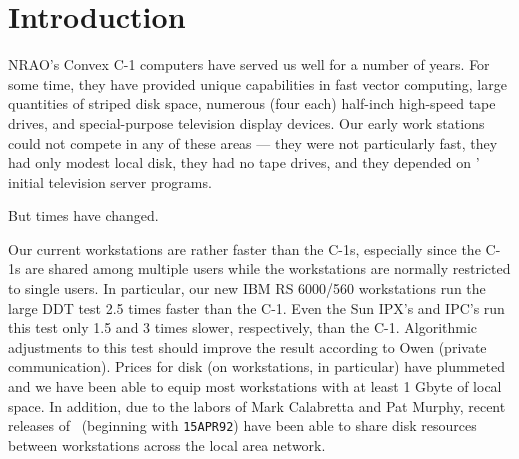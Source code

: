 \title{\memtit}
\vskip -30pt
\maketitle
\vskip -30pt
\normalstyle

\begin{abstract}
     This memo summarizes the progress we have made in replacing the
previously unique capabilities of NRAO's Convex C-1 computers.  The
situation with disks, tape devices, and basic television displays
is quite good.  Two new tasks have now appeared in \AIPS\ to emulate
the IIS Model 70 displays' capabilities to display two or three
independent images at the same time.  One task displays hue and
intensity images together, while the other displays independent red,
green and blue images at the same time and both work on workstation
\AIPS\ displays as well as on special-purpose devices.  These tasks
are not as fast or as capable of subtle colors as the IIS, but they go
a long ways to replacing the last of the Convexs' unique properties.
\end{abstract}

\section{Introduction}

     NRAO's Convex C-1 computers have served us well for a number of
years.  For some time, they have provided unique capabilities in fast
vector computing, large quantities of striped disk space, numerous
(four each) half-inch high-speed tape drives, and special-purpose
television display devices.  Our early work stations could not compete
in any of these areas --- they were not particularly fast, they had
only modest local disk, they had no tape drives, and they depended on
\AIPS' initial television server programs.

    But times have changed.

    Our current workstations are rather faster than the C-1s,
especially since the C-1s are shared among multiple users while the
workstations are normally restricted to single users.  In particular,
our new IBM RS 6000/560 workstations run the large DDT test 2.5 times
faster than the C-1.  Even the Sun IPX's and IPC's run this test only
1.5 and 3 times slower, respectively, than the C-1.  Algorithmic
adjustments to this test should improve the result according to Owen
(private communication).  Prices for disk (on workstations, in
particular) have plummeted and we have been able to equip most
workstations with at least 1 Gbyte of local space.  In addition, due
to the labors of Mark Calabretta and Pat Murphy, recent releases of
\AIPS\ (beginning with {\tt 15APR92}) have been able to share disk
resources between workstations across the local area network.

